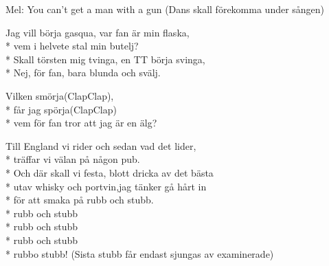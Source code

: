 \begin{SongText}
    \begin{SongInfo}
        Mel: You can’t get a man with a gun
        (Dans skall förekomma under sången)
    \end{SongInfo}
    \begin{SongVerse}
        Jag vill börja gasqua, var fan är min flaska,\\*%
        vem i helvete stal min butelj?\\*%
        Skall törsten mig tvinga, en TT börja svinga,\\*%
        Nej, för fan, bara blunda och svälj.
    \end{SongVerse}
    \begin{SongVerse}
        Vilken smörja(ClapClap),\\*%
        får jag spörja(ClapClap)\\*%
        vem för fan tror att jag är en älg?
    \end{SongVerse}
    \begin{SongVerse}
        Till England vi rider och sedan vad det lider,\\*%
        träffar vi välan på någon pub.\\*%
        Och där skall vi festa, blott dricka av det bästa\\*%
        utav whisky och portvin,jag tänker gå hårt in\\*%
        för att smaka på rubb och stubb.\\*%
        rubb och stubb\\*%
        rubb och stubb\\*%
        rubb och stubb\\*%
        rubbo stubb! (Sista stubb får endast sjungas av
        examinerade)
    \end{SongVerse}
\end{SongText}
